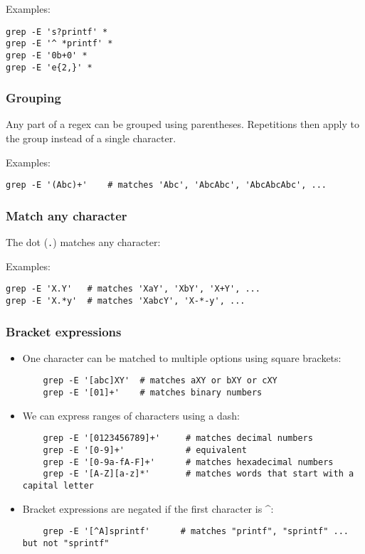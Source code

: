 \documentclass[12pt]{article}
\begin{document}
\noindent Examples:

\begin{verbatim}
grep -E 's?printf' *
grep -E '^ *printf' *
grep -E '0b+0' *
grep -E 'e{2,}' *
\end{verbatim}

\subsubsection{Grouping}

Any part of a regex can be grouped using parentheses.
Repetitions then apply to the group instead of a single character.

\noindent Examples:

\begin{verbatim}
grep -E '(Abc)+'    # matches 'Abc', 'AbcAbc', 'AbcAbcAbc', ...
\end{verbatim}

\subsubsection{Match any character}

The dot (\texttt{.}) matches any character:

\noindent Examples:

\begin{verbatim}
grep -E 'X.Y'   # matches 'XaY', 'XbY', 'X+Y', ...
grep -E 'X.*y'  # matches 'XabcY', 'X-*-y', ...
\end{verbatim}

\subsubsection{Bracket expressions}

\begin{itemize}
    \item One character can be matched to multiple options using square brackets:
    \begin{verbatim}
    grep -E '[abc]XY'  # matches aXY or bXY or cXY
    grep -E '[01]+'    # matches binary numbers
    \end{verbatim}

    \item We can express ranges of characters using a dash:
    \begin{verbatim}
    grep -E '[0123456789]+'     # matches decimal numbers
    grep -E '[0-9]+'            # equivalent
    grep -E '[0-9a-fA-F]+'      # matches hexadecimal numbers
    grep -E '[A-Z][a-z]*'       # matches words that start with a capital letter
    \end{verbatim}

    \item Bracket expressions are negated if the first character is \textasciicircum:
    \begin{verbatim}
    grep -E '[^A]sprintf'      # matches "printf", "sprintf" ... but not "sprintf"
    \end{verbatim}
\end{itemize}
\end{document}
